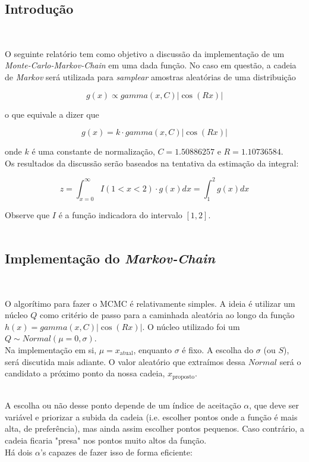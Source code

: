 \documentclass[pt12]{article}
\begin{document}
\tableofcontents

\newpage

\begin{center}\section{Introdução}\end{center}
\

O seguinte relatório tem como objetivo a discussão da implementação de um \textit{Monte-Carlo-Markov-Chain} em uma dada função. No caso em questão, a cadeia de \textit{Markov} será utilizada para \textit{samplear} amostras aleatórias de uma distribuição 

$$g(x) \varpropto gamma(x, C)|\cos(Rx)|$$

\noindent o que equivale a dizer que

$$g(x) = k\cdot gamma(x, C)|\cos (Rx)|$$

\noindent onde $k$ é uma constante de normalização, $C = 1.50886257$ e $R = 1.10736584$.\\

Os resultados da discussão serão baseados na tentativa da estimação da integral:

$$z = \int_{x=0}^\infty I(1 < x < 2)\cdot g(x)dx = \int_{1}^2 g(x)dx$$

Observe que $I$ é a função indicadora do intervalo $[1,2]$.\\
\ 

\subsection{Implementação do \textit{Markov-Chain}}
\ 

O algorítimo para fazer o MCMC é relativamente simples. A ideia é utilizar um núcleo $Q$ como critério de passo para a caminhada aleatória ao longo da função $h(x) = gamma(x,C)|\cos(Rx)|$. O núcleo utilizado foi um $Q \sim Normal(\mu = 0,\sigma )$.\\
\indent Na implementação em si, $\mu = x_{\text{atual}}$, enquanto $\sigma$ é fixo. A escolha do $\sigma$ (ou $S$), será discutida mais adiante. O valor aleatório que extraímos dessa $Normal$ será o candidato a próximo ponto da nossa cadeia, $x_{\text{proposto}}$.\\
\ 

A escolha ou não desse ponto depende de um índice de aceitação $\alpha$, que deve ser variável e priorizar a subida da cadeia (i.e. escolher pontos onde a função é mais alta, de preferência), mas ainda assim escolher pontos pequenos. Caso contrário, a cadeia ficaria "presa" nos pontos muito altos da função.\\
Há dois $\alpha$'s capazes de fazer isso de forma eficiente:\\
\end{document}
